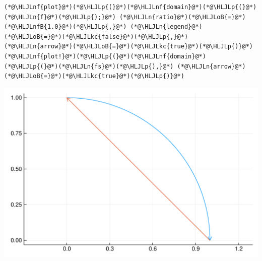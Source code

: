 \documentclass[12pt,a4paper]{article}
\newcommand{\HLJLkc}[1]{\textcolor[RGB]{59,151,46}{\textit{#1}}}
\newcommand{\HLJLn}[1]{#1}
\newcommand{\HLJLnf}[1]{\textcolor[RGB]{66,102,213}{#1}}
\newcommand{\HLJLnfB}[1]{\textcolor[RGB]{59,151,46}{#1}}
\newcommand{\HLJLoB}[1]{\textcolor[RGB]{102,102,102}{\textbf{#1}}}
\newcommand{\HLJLp}[1]{#1}
\begin{document}
\begin{lstlisting}
(*@\HLJLnf{plot}@*)(*@\HLJLp{(}@*)(*@\HLJLnf{domain}@*)(*@\HLJLp{(}@*)(*@\HLJLn{f}@*)(*@\HLJLp{);}@*) (*@\HLJLn{ratio}@*)(*@\HLJLoB{=}@*)(*@\HLJLnfB{1.0}@*)(*@\HLJLp{,}@*) (*@\HLJLn{legend}@*)(*@\HLJLoB{=}@*)(*@\HLJLkc{false}@*)(*@\HLJLp{,}@*) (*@\HLJLn{arrow}@*)(*@\HLJLoB{=}@*)(*@\HLJLkc{true}@*)(*@\HLJLp{)}@*)
(*@\HLJLnf{plot!}@*)(*@\HLJLp{(}@*)(*@\HLJLnf{domain}@*)(*@\HLJLp{(}@*)(*@\HLJLn{fs}@*)(*@\HLJLp{),}@*) (*@\HLJLn{arrow}@*)(*@\HLJLoB{=}@*)(*@\HLJLkc{true}@*)(*@\HLJLp{)}@*)
\end{lstlisting}

\includegraphics[width=\linewidth]{figures/Lecture1_30_1.pdf}
\end{document}
